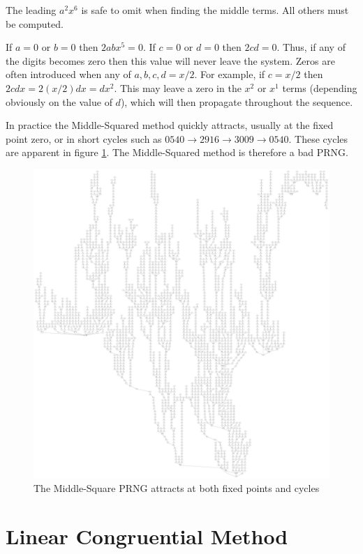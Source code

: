 \documentclass{book}
\begin{document}
The leading $a^2x^6$ is safe to omit when finding the middle terms. All others must be computed.

If $a=0$ or $b=0$ then $2abx^5=0$. If $c=0$ or $d=0$ then $2cd=0$. Thus, if any of the digits becomes zero then this value will never leave the system. Zeros are often introduced when any of $a,b,c,d=x/2$. For example, if $c=x/2$ then $2cdx=2(x/2)dx=dx^2$. This may leave a zero in the $x^2$ or $x^1$ terms (depending obviously on the value of $d$), which will then propagate throughout the sequence.

In practice the Middle-Squared method quickly attracts, usually at the fixed point zero, or in short cycles such as $0540 \to 2916 \to 3009 \to 0540$. These cycles are apparent in figure \ref{middlesquare}. The Middle-Squared method is therefore a bad PRNG.

\begin{figure}[H]
\centering
\includegraphics[width=\textwidth,height=.95\textheight,keepaspectratio]{ch-attractors/middlesquare}
\caption{The Middle-Square PRNG attracts at both fixed points and cycles}
\label{middlesquare}
\end{figure}

\section{Linear Congruential Method}
\end{document}
